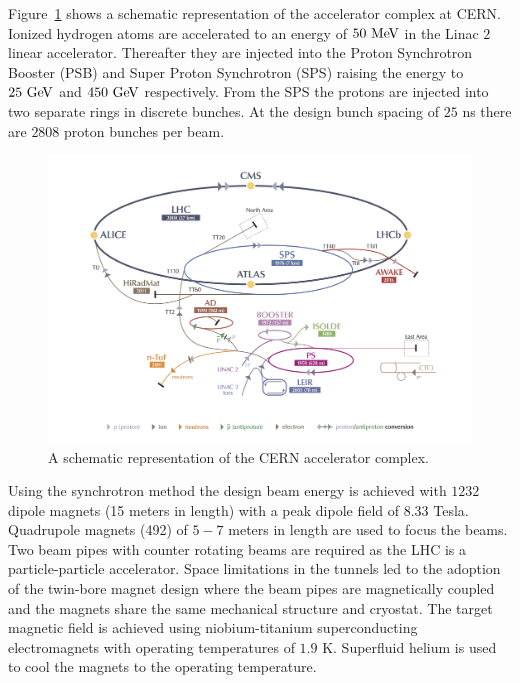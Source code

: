 Figure~\ref{fig:cern} shows a schematic representation of the accelerator complex at CERN. Ionized hydrogen atoms are accelerated to an energy of $50~\mathrm{Me\kern -0.1em V}$ in the Linac $2$ linear accelerator. Thereafter they are injected into the Proton Synchrotron Booster (PSB) and Super Proton Synchrotron (SPS) raising the energy to $25~\mathrm{Ge\kern -0.1em V}$ and $450~\mathrm{Ge\kern -0.1em V}$ respectively. From the SPS the protons are injected into two separate rings in discrete bunches. At the design bunch spacing of $25$ ns there are $2808$ proton bunches per beam. 

\begin{figure}[h]
\centering
\includegraphics[width=1.0\columnwidth]{figures_chapter2/cern_complex.jpg}
\caption{A schematic representation of the CERN accelerator complex\cite{Haffner:1621894}.}
\label{fig:cern}
\end{figure}

Using the synchrotron method the design beam energy is achieved with $1232$ dipole magnets (15 meters in length) with a peak dipole field of $8.33$ Tesla. Quadrupole magnets (492) of $5-7$ meters in length are used to focus the beams. Two beam pipes with counter rotating beams are required as the LHC is a particle-particle accelerator.  Space limitations in the tunnels led to the adoption of the twin-bore\cite{Blewett:1971zzb} magnet design where the beam pipes are magnetically coupled and the magnets share the same mechanical structure and cryostat. The target magnetic field is achieved using niobium-titanium superconducting electromagnets with operating temperatures of $1.9$ K. Superfluid helium is used to cool the magnets to the operating temperature.   

